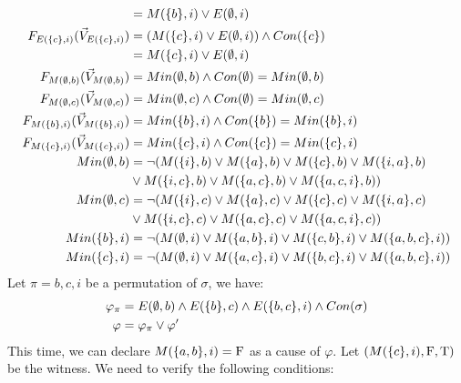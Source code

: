 \begin{example}
\begin{align*}
                         & = M(\{b\},i) \vee E(\emptyset,i)                                            \\
        F_{E(\{c\},i)}(\vec V_{E(\{c\},i)})   & = (M(\{c\},i) \vee E(\emptyset,i))\wedge Con(\{c\})                         \\
                         & = M(\{c\},i) \vee E(\emptyset,i)                                            \\
        F_{M(\emptyset,b)}(\vec V_{M(\emptyset,b)})      & = Min(\emptyset,b) \wedge Con(\emptyset) = Min(\emptyset,b)                               \\
        F_{M(\emptyset,c)}(\vec V_{M(\emptyset,c)})      & = Min(\emptyset,c) \wedge Con(\emptyset) = Min(\emptyset,c)                               \\
        F_{M(\{b\},i)}(\vec V_{M(\{b\},i)})   & = Min(\{b\},i) \wedge Con(\{b\}) = Min(\{b\},i)                      \\
        F_{M(\{c\},i)}(\vec V_{M(\{c\},i)})   & = Min(\{c\},i) \wedge Con(\{c\}) = Min(\{c\},i)                      \\
        Min(\emptyset,b)        & = \neg (M(\{i\},b) \vee M(\{a\},b) \vee M(\{c\},b) \vee M(\{i,a\},b) \\
                         & \vee M(\{i,c\},b) \vee M(\{a,c\},b) \vee M(\{a,c,i\},b))             \\
        Min(\emptyset,c)        & = \neg (M(\{i\},c) \vee M(\{a\},c) \vee M(\{c\},c) \vee M(\{i,a\},c) \\
                         & \vee M(\{i,c\},c) \vee M(\{a,c\},c) \vee M(\{a,c,i\},c))             \\
        Min(\{b\},i)     & = \neg (M(\emptyset,i)\vee M(\{a,b\},i) \vee M(\{c,b\},i)
        \vee M(\{a,b,c\},i))                                                                    \\
        Min(\{c\},i)     & = \neg (M(\emptyset,i)\vee M(\{a,c\},i) \vee M(\{b,c\},i)
        \vee M(\{a,b,c\},i))                                                                    \\
    \end{align*}
    Let $\pi = b,c,i$ be a permutation of $\sigma$, we have:
    \begin{align*}
        \varphi_{\pi} & =
        E(\emptyset,b) \wedge E(\{b\},c) \wedge E(\{b,c\},i)
        \wedge Con(\sigma)                            \\
        \varphi       & = \varphi_{\pi} \vee \varphi'
    \end{align*}
    This time, we can declare $M(\{a,b\},i) = \mathrm{F}$ as a cause of $\varphi$.
    Let $(M(\{c\},i),\mathrm{F},\mathrm{T})$ be the witness.
    We need to verify the following conditions:
    \begin{itemize}

\end{itemize}
\end{example}
